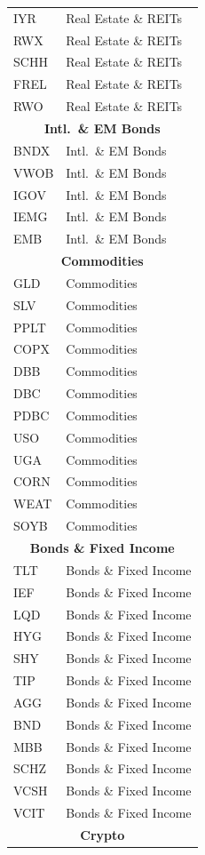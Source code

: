 \begin{longtable}{ll}
IYR & Real Estate \& REITs \\
RWX & Real Estate \& REITs \\
SCHH & Real Estate \& REITs \\
FREL & Real Estate \& REITs \\
RWO & Real Estate \& REITs \\
\multicolumn{2}{c}{\textbf{Intl.\ \& EM Bonds}} \\
BNDX & Intl.\ \& EM Bonds \\
VWOB & Intl.\ \& EM Bonds \\
IGOV & Intl.\ \& EM Bonds \\
IEMG & Intl.\ \& EM Bonds \\
EMB  & Intl.\ \& EM Bonds \\
\multicolumn{2}{c}{\textbf{Commodities}} \\
GLD  & Commodities \\
SLV  & Commodities \\
PPLT & Commodities \\
COPX & Commodities \\
DBB  & Commodities \\
DBC  & Commodities \\
PDBC & Commodities \\
USO  & Commodities \\
UGA  & Commodities \\
CORN & Commodities \\
WEAT & Commodities \\
SOYB & Commodities \\
\multicolumn{2}{c}{\textbf{Bonds \& Fixed Income}} \\
TLT  & Bonds \& Fixed Income \\
IEF  & Bonds \& Fixed Income \\
LQD  & Bonds \& Fixed Income \\
HYG  & Bonds \& Fixed Income \\
SHY  & Bonds \& Fixed Income \\
TIP  & Bonds \& Fixed Income \\
AGG  & Bonds \& Fixed Income \\
BND  & Bonds \& Fixed Income \\
MBB  & Bonds \& Fixed Income \\
SCHZ & Bonds \& Fixed Income \\
VCSH & Bonds \& Fixed Income \\
VCIT & Bonds \& Fixed Income \\
\multicolumn{2}{c}{\textbf{Crypto}} \\

\end{longtable}
